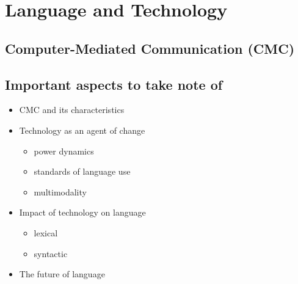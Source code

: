 \documentclass[../main.tex]{subfiles}
\begin{document}
    \section{Language and Technology}
    \subsection{Computer-Mediated Communication (CMC)}

    \subsection{Important aspects to take note of}
    \begin{itemize}
        \item CMC and its characteristics
        \item Technology as an agent of change \begin{itemize}
            \item power dynamics
            \item standards of language use
            \item multimodality
        \end{itemize}
        \item Impact of technology on language \begin{itemize}
            \item lexical
            \item syntactic
        \end{itemize}
        \item The future of language
    \end{itemize}
\end{document}
